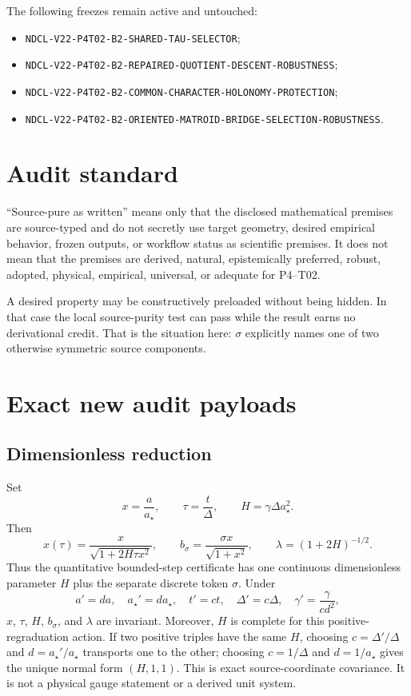 \documentclass[11pt]{article}
\begin{document}
The following freezes remain active and untouched:
\begin{itemize}[leftmargin=*]
  \item \texttt{NDCL-V22-P4T02-B2-SHARED-TAU-SELECTOR};
  \item \texttt{NDCL-V22-P4T02-B2-REPAIRED-QUOTIENT-DESCENT-ROBUSTNESS};
  \item \texttt{NDCL-V22-P4T02-B2-COMMON-CHARACTER-HOLONOMY-PROTECTION};
  \item \texttt{NDCL-V22-P4T02-B2-ORIENTED-MATROID-BRIDGE-SELECTION-ROBUSTNESS}.
\end{itemize}

\section{Audit standard}

``Source-pure as written'' means only that the disclosed mathematical premises
are source-typed and do not secretly use target geometry, desired empirical
behavior, frozen outputs, or workflow status as scientific premises.  It does
not mean that the premises are derived, natural, epistemically preferred,
robust, adopted, physical, empirical, universal, or adequate for P4--T02.

A desired property may be constructively preloaded without being hidden.  In
that case the local source-purity test can pass while the result earns no
derivational credit.  That is the situation here: $\sigma$ explicitly names
one of two otherwise symmetric source components.

\section{Exact new audit payloads}

\subsection{Dimensionless reduction}

Set
\[
 x=\frac{a}{a_\star},\qquad
 \tau=\frac{t}{\Delta},\qquad
 H=\gamma\Delta a_\star^2.
\]
Then
\[
 x(\tau)=\frac{x}{\sqrt{1+2H\tau x^2}},\qquad
 b_\sigma=\frac{\sigma x}{\sqrt{1+x^2}},\qquad
 \lambda=(1+2H)^{-1/2}.
\]
Thus the quantitative bounded-step certificate has one continuous
dimensionless parameter $H$ plus the separate discrete token $\sigma$.
Under
\[
 a'=da,\quad a_\star'=da_\star,\quad t'=ct,\quad
 \Delta'=c\Delta,\quad \gamma'=\frac{\gamma}{cd^2},
\]
$x$, $\tau$, $H$, $b_\sigma$, and $\lambda$ are invariant.  Moreover, $H$ is
complete for this positive-regraduation action.  If two positive triples have
the same $H$, choosing $c=\Delta'/\Delta$ and
$d=a_\star'/a_\star$ transports one to the other; choosing
$c=1/\Delta$ and $d=1/a_\star$ gives the unique normal form $(H,1,1)$.
This is exact
source-coordinate covariance.  It is not a physical gauge statement or a
derived unit system.
\end{document}
